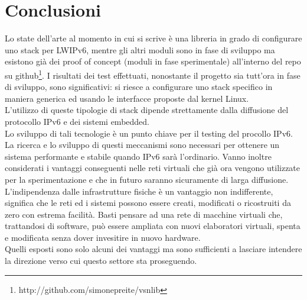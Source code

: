 
\chapter*{Conclusioni}
Lo state dell'arte al momento in cui si scrive \`e una libreria in grado di configurare uno stack per LWIPv6, mentre gli altri moduli sono in fase di sviluppo ma esistono gi\`a dei proof of concept (moduli in fase sperimentale) all'interno del repo su github\footnote{http://github.com/simonepreite/vsnlib}.
I risultati dei test effettuati, nonostante il progetto sia tutt'ora in fase di sviluppo, sono significativi: si riesce a configurare uno stack specifico in maniera generica ed usando le interfacce proposte dal kernel Linux.\\
L'utilizzo di queste tipologie di stack dipende strettamente dalla diffusione del protocollo IPv6 e dei sistemi embedded.\\
Lo sviluppo di tali tecnologie \`e un punto chiave per il testing del procollo IPv6.\\
La ricerca e lo sviluppo di questi meccanismi sono necessari per ottenere un sistema performante e stabile quando IPv6 sar\`a l'ordinario. Vanno inoltre considerati i vantaggi conseguenti nelle reti virtuali che gi\`a ora vengono utilizzate per la sperimentazione e che in futuro saranno sicuramente di larga diffusione.\\
L'indipendenza dalle infrastrutture fisiche \`e un vantaggio non indifferente, significa che le reti ed i sistemi possono essere creati, modificati o ricostruiti da zero con estrema facilit\`a. Basti pensare ad una rete di macchine virtuali che, trattandosi di software, pu\`o essere ampliata con nuovi elaboratori virtuali, spenta e modificata senza dover invesitire in nuovo hardware.\\
Quelli esposti sono solo alcuni dei vantaggi ma sono sufficienti a lasciare intendere la direzione verso cui questo settore sta proseguendo.
